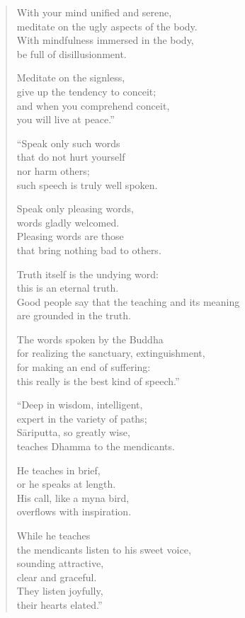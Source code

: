 \documentclass[12pt,openany]{book}%
\begin{document}
\begin{verse}
With your mind unified and serene, \\
meditate on the ugly aspects of the body. \\
With mindfulness immersed in the body, \\
be full of disillusionment. 

Meditate on the signless, \\
give up the tendency to conceit; \\
and when you comprehend conceit, \\
you will live at peace.” 

“Speak only such words \\
that do not hurt yourself \\
nor harm others; \\
such speech is truly well spoken. 

Speak only pleasing words, \\
words gladly welcomed. \\
Pleasing words are those \\
that bring nothing bad to others. 

Truth itself is the undying word: \\
this is an eternal truth. \\
Good people say that the teaching and its meaning \\
are grounded in the truth. 

The words spoken by the Buddha \\
for realizing the sanctuary, extinguishment, \\
for making an end of suffering: \\
this really is the best kind of speech.” 

“Deep in wisdom, intelligent, \\
expert in the variety of paths; \\
\textsanskrit{Sāriputta}, so greatly wise, \\
teaches Dhamma to the mendicants. 

He teaches in brief, \\
or he speaks at length. \\
His call, like a myna bird, \\
overflows with inspiration. 

While he teaches \\
the mendicants listen to his sweet voice, \\
sounding attractive, \\
clear and graceful. \\
They listen joyfully, \\
their hearts elated.” 


\end{verse}
\end{document}
